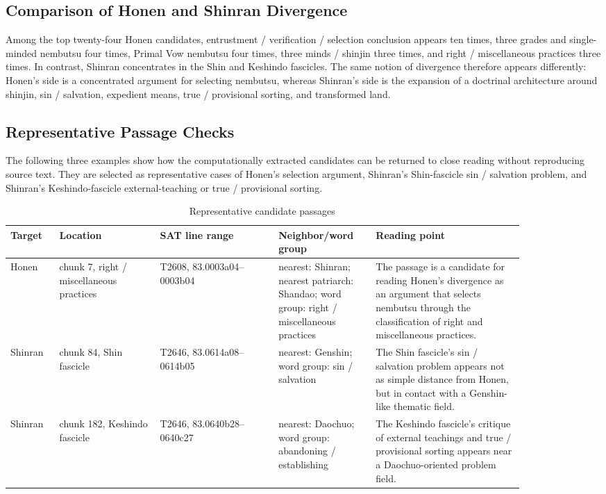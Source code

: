 \documentclass[uplatex,dvipdfmx,11pt,a4paper]{jsarticle}
\begin{document}
\subsection{Comparison of Honen and Shinran Divergence}

Among the top twenty-four Honen candidates, entrustment / verification / selection conclusion appears ten times, three grades and single-minded nembutsu four times, Primal Vow nembutsu four times, three minds / shinjin three times, and right / miscellaneous practices three times. In contrast, Shinran concentrates in the Shin and Keshindo fascicles. The same notion of divergence therefore appears differently: Honen's side is a concentrated argument for selecting nembutsu, whereas Shinran's side is the expansion of a doctrinal architecture around shinjin, sin / salvation, expedient means, true / provisional sorting, and transformed land.

\subsection{Representative Passage Checks}

The following three examples show how the computationally extracted candidates can be returned to close reading without reproducing source text. They are selected as representative cases of Honen's selection argument, Shinran's Shin-fascicle sin / salvation problem, and Shinran's Keshindo-fascicle external-teaching or true / provisional sorting.

\begin{table}[H]
\centering
\footnotesize
\setlength{\tabcolsep}{2pt}
\caption{Representative candidate passages}
\label{tab:case-study-chunks}
\begin{tabular}{@{}p{0.08\linewidth}p{0.17\linewidth}p{0.20\linewidth}p{0.16\linewidth}p{0.25\linewidth}@{}}
\toprule
Target & Location & SAT line range & Neighbor/word group & Reading point \\
\midrule
Honen & chunk 7, right / miscellaneous practices & T2608, 83.0003a04--0003b04 & nearest: Shinran; nearest patriarch: Shandao; word group: right / miscellaneous practices & The passage is a candidate for reading Honen's divergence as an argument that selects nembutsu through the classification of right and miscellaneous practices. \\
Shinran & chunk 84, Shin fascicle & T2646, 83.0614a08--0614b05 & nearest: Genshin; word group: sin / salvation & The Shin fascicle's sin / salvation problem appears not as simple distance from Honen, but in contact with a Genshin-like thematic field. \\
Shinran & chunk 182, Keshindo fascicle & T2646, 83.0640b28--0640c27 & nearest: Daochuo; word group: abandoning / establishing & The Keshindo fascicle's critique of external teachings and true / provisional sorting appears near a Daochuo-oriented problem field. \\
\bottomrule
\end{tabular}
\end{table}
\end{document}
